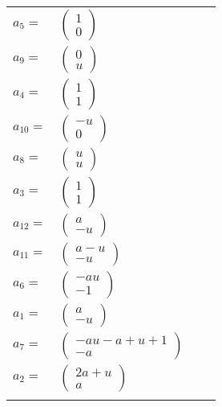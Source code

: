 \documentclass[1p]{elsarticle_modified}
\theoremstyle{definition}
\begin{document}
\begin{tabular}{m{7pt} m{180pt} m{7pt} m{180pt} }
\flushright $a_{5}=$&$\begin{pmatrix}1\\0\end{pmatrix}$ \\
\flushright $a_{9}=$&$\begin{pmatrix}0\\u\end{pmatrix}$ \\
\flushright $a_{4}=$&$\begin{pmatrix}1\\1\end{pmatrix}$ \\
\flushright $a_{10}=$&$\begin{pmatrix}- u\\0\end{pmatrix}$ \\
\flushright $a_{8}=$&$\begin{pmatrix}u\\u\end{pmatrix}$ \\
\flushright $a_{3}=$&$\begin{pmatrix}1\\1\end{pmatrix}$ \\
\flushright $a_{12}=$&$\begin{pmatrix}a\\- u\end{pmatrix}$ \\
\flushright $a_{11}=$&$\begin{pmatrix}a- u\\- u\end{pmatrix}$ \\
\flushright $a_{6}=$&$\begin{pmatrix}- a u\\-1\end{pmatrix}$ \\
\flushright $a_{1}=$&$\begin{pmatrix}a\\- u\end{pmatrix}$ \\
\flushright $a_{7}=$&$\begin{pmatrix}- a u- a+u+1\\- a\end{pmatrix}$ \\
\flushright $a_{2}=$&$\begin{pmatrix}2 a+u\\a\end{pmatrix}$\\&\end{tabular}
\end{document}
